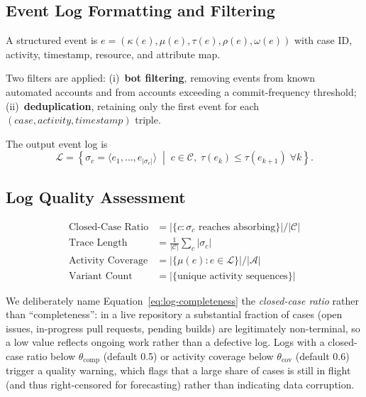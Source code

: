 \subsection{Event Log Formatting and Filtering}
\label{sec:s1-formatting}

\begin{definition}
\label{def:structured-event}
A structured event is
$e = (\kappa(e), \mu(e), \tau(e), \rho(e), \omega(e))$ with case ID,
activity, timestamp, resource, and attribute map.
\end{definition}

Two filters are applied: (i)~\textbf{bot filtering}, removing events from
known automated accounts and from accounts exceeding a commit-frequency
threshold; (ii)~\textbf{deduplication}, retaining only the first event for
each $(case, activity, timestamp)$ triple.

The output event log is
\begin{equation}
\label{eq:final-log}
\mathcal{L} = \left\{ \sigma_c = \langle e_1, \ldots, e_{|\sigma_c|} \rangle
    \;\middle|\; c \in \mathcal{C}, \;
    \tau(e_k) \leq \tau(e_{k+1}) \; \forall k \right\}.
\end{equation}


\subsection{Log Quality Assessment}
\label{sec:s1-quality}

\begin{definition}
\label{def:log-quality}
\begin{align}
\text{Closed-Case Ratio} &= |\{c : \sigma_c \text{ reaches absorbing}\}| / |\mathcal{C}| \label{eq:log-completeness} \\
\text{Trace Length}      &= \tfrac{1}{|\mathcal{C}|} \sum_c |\sigma_c| \label{eq:trace-length} \\
\text{Activity Coverage} &= |\{\mu(e) : e \in \mathcal{L}\}| / |\mathcal{A}| \label{eq:activity-coverage} \\
\text{Variant Count}     &= |\{\text{unique activity sequences}\}| \label{eq:variant-count}
\end{align}
\end{definition}

We deliberately name Equation~\ref{eq:log-completeness} the
\emph{closed-case ratio} rather than ``completeness'': in a live repository
a substantial fraction of cases (open issues, in-progress pull requests,
pending builds) are legitimately non-terminal, so a low value reflects
ongoing work rather than a defective log. Logs with a closed-case ratio
below $\theta_{\text{comp}}$ (default 0.5) or activity coverage below
$\theta_{\text{cov}}$ (default 0.6) trigger a quality warning, which flags
that a large share of cases is still in flight (and thus right-censored for
forecasting) rather than indicating data corruption.


